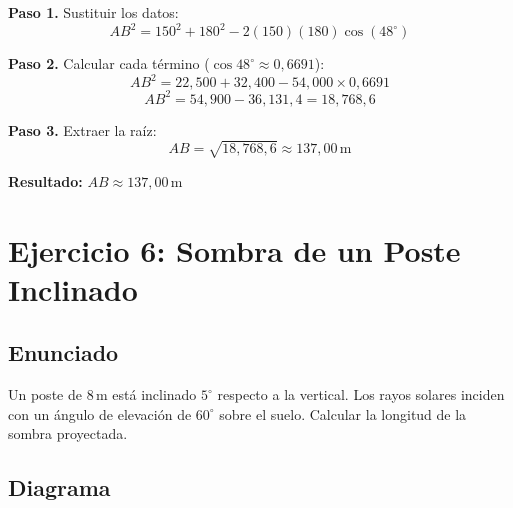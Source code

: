 \documentclass[11pt, letterpaper]{article}
\begin{document}
\textbf{Paso 1.} Sustituir los datos:
\[
  AB^2 = 150^2 + 180^2 - 2(150)(180)\cos(48^\circ)
\]

\textbf{Paso 2.} Calcular cada término (\(\cos 48^\circ \approx 0{,}6691\)):
\[
  AB^2 = 22{,}500 + 32{,}400 - 54{,}000 \times 0{,}6691
\]
\[
  AB^2 = 54{,}900 - 36{,}131{,}4 = 18{,}768{,}6
\]

\textbf{Paso 3.} Extraer la raíz:
\[
  AB = \sqrt{18{,}768{,}6} \approx 137{,}00\,\text{m}
\]

\begin{resultbox}
\textbf{Resultado:} \quad \(AB \approx 137{,}00\,\text{m}\)
\end{resultbox}

\newpage
\section{Ejercicio 6: Sombra de un Poste Inclinado}

\subsection*{Enunciado}
Un poste de \(8\,\text{m}\) está inclinado \(5^\circ\) respecto a la vertical.
Los rayos solares inciden con un ángulo de elevación de \(60^\circ\) sobre el suelo.
Calcular la longitud de la sombra proyectada.

\subsection*{Diagrama}

\begin{center}
\end{center}
\end{document}
